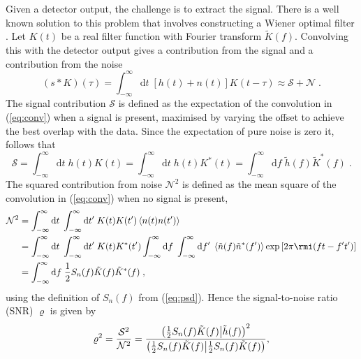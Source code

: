 Given a detector output, the challenge is to extract the signal. There is a well known solution to this problem that involves constructing a Wiener optimal filter \citep{Wiener49}. Let $K(t)$ be a real filter function with Fourier transform $\tilde{K}(f)$. Convolving this with the detector output gives a contribution from the signal and a contribution from the noise
\begin{equation}\label{eq:conv}
\left(s*K\right)(\tau) = \int_{-\infty}^{\infty}\mathrm{d}t\;\left[h(t)+n(t)\right]K(t-\tau) \approx \mathcal{S} + \mathcal{N} \; .
\end{equation}
The signal contribution $\mathcal{S}$ is defined as the expectation of the convolution in (\ref{eq:conv}) when a signal is present, maximised by varying the offset to achieve the best overlap with the data. Since the expectation of pure noise is zero it, follows that
\begin{equation}
\mathcal{S} = \int_{-\infty}^{\infty}\mathrm{d}t\;h(t)K(t)=\int_{-\infty}^{\infty}\mathrm{d}t\;h(t)K^{*}(t)=\int_{-\infty}^{\infty}\mathrm{d}f\; \tilde{h}(f)\tilde{K}^{*}(f) \; .
\end{equation}
The squared contribution from noise $\mathcal{N}^{2}$ is defined as the mean square of the convolution in (\ref{eq:conv}) when no signal is present,
\begin{eqnarray} 
\mathcal{N}^{2} &= \int_{-\infty}^{\infty}\mathrm{d}t\;\int_{-\infty}^{\infty}\mathrm{d}t'\;K(t)K(t')\left<n(t)n(t')\right> \nonumber \\
 &= \int_{-\infty}^{\infty}\mathrm{d}t\;\int_{-\infty}^{\infty}\mathrm{d}t'\;K(t)K^{*}(t')\int_{-\infty}^{\infty}\mathrm{d}f\;\int_{-\infty}^{\infty}\mathrm{d}f'\;\left<\tilde{n}(f)\tilde{n}^{*}(f')\right>\exp\left[2\pi\rmi(ft-f't')\right]\nonumber \\
 &= \int_{-\infty}^{\infty}\mathrm{d}f \; \frac{1}{2}S_{n}(f)\tilde{K}(f)\tilde{K}^{*}(f) \; ,
 \end{eqnarray}
using the definition of $S_{n}(f)$ from (\ref{eq:psd}). Hence the signal-to-noise ratio (SNR) $\varrho$ is given by
\begin{equation}\label{eq:SNRinnerprod} 
\varrho^{2} = \frac{\mathcal{S}^{2}}{\mathcal{N}^{2}}= \frac{\left({\frac{1}{2}S_{n}(f)\tilde{K}(f)}\middle|{\tilde{h}(f)}\right)^{2}}{\left({\frac{1}{2}S_{n}(f)\tilde{K}(f)}\middle|{\frac{1}{2}S_{n}(f)\tilde{K}(f)}\right)},
\end{equation}
